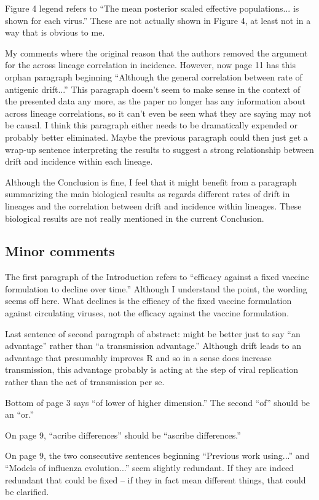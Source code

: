 \documentclass[11pt,oneside,letterpaper]{article}
\begin{document}
Figure 4 legend refers to ``The mean posterior scaled effective populations... is shown for each virus.'' These are not actually shown in Figure 4, at least not in a way that is obvious to me. 

My comments where the original reason that the authors removed the argument for the across lineage correlation in incidence. However, now page 11 has this orphan paragraph beginning ``Although the general correlation between rate of antigenic drift...'' This paragraph doesn't seem to make sense in the context of the presented data any more, as the paper no longer has any information about across lineage correlations, so it can't even be seen what they are saying may not be causal. I think this paragraph either needs to be dramatically expended or probably better eliminated. Maybe the previous paragraph could then just get a wrap-up sentence interpreting the results to suggest a strong relationship between drift and incidence within each lineage. 

Although the Conclusion is fine, I feel that it might benefit from a paragraph summarizing the main biological results as regards different rates of drift in lineages and the correlation between drift and incidence within lineages. These biological results are not really mentioned in the current Conclusion. 

\subsection*{Minor comments}

The first paragraph of the Introduction refers to ``efficacy against a fixed vaccine formulation to decline over time.'' Although I understand the point, the wording seems off here. What declines is the efficacy of the fixed vaccine formulation against circulating viruses, not the efficacy against the vaccine formulation. 

Last sentence of second paragraph of abstract: might be better just to say ``an advantage'' rather than ``a transmission advantage.'' Although drift leads to an advantage that presumably improves R and so in a sense does increase transmission, this advantage probably is acting at the step of viral replication rather than the act of transmission per se. 

Bottom of page 3 says ``of lower of higher dimension.'' The second ``of'' should be an ``or.'' 

On page 9, ``acribe differences'' should be ``ascribe differences.'' 

On page 9, the two consecutive sentences beginning ``Previous work using...'' and ``Models of influenza evolution...'' seem slightly redundant. If they are indeed redundant that could be fixed -- if they in fact mean different things, that could be clarified. 
\end{document}
